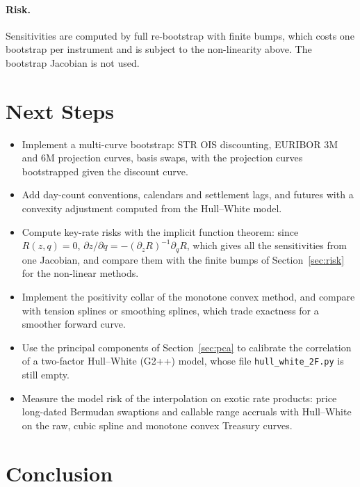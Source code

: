\documentclass[11pt,a4paper]{article}
\theoremstyle{plain}
\theoremstyle{definition}
\begin{document}
\paragraph{Risk.} Sensitivities are computed by full re-bootstrap with finite bumps, which costs one bootstrap per instrument and is subject to the non-linearity above. The bootstrap Jacobian is not used.

\section{Next Steps}
\label{sec:next-steps}

\begin{itemize}
    \item Implement a multi-curve bootstrap: \texteuro STR OIS discounting, EURIBOR 3M and 6M projection curves, basis swaps, with the projection curves bootstrapped given the discount curve.
    \item Add day-count conventions, calendars and settlement lags, and futures with a convexity adjustment computed from the Hull--White model.
    \item Compute key-rate risks with the implicit function theorem: since $R(z,q)=0$, $\partial z/\partial q=-(\partial_zR)^{-1}\partial_qR$, which gives all the sensitivities from one Jacobian, and compare them with the finite bumps of Section~\ref{sec:risk} for the non-linear methods.
    \item Implement the positivity collar of the monotone convex method, and compare with tension splines or smoothing splines, which trade exactness for a smoother forward curve.
    \item Use the principal components of Section~\ref{sec:pca} to calibrate the correlation of a two-factor Hull--White (G2++) model, whose file \texttt{hull\_white\_2F.py} is still empty.
    \item Measure the model risk of the interpolation on exotic rate products: price long-dated Bermudan swaptions and callable range accruals with Hull--White on the raw, cubic spline and monotone convex Treasury curves.
\end{itemize}

\section{Conclusion}
\label{sec:conclusion}
\end{document}

